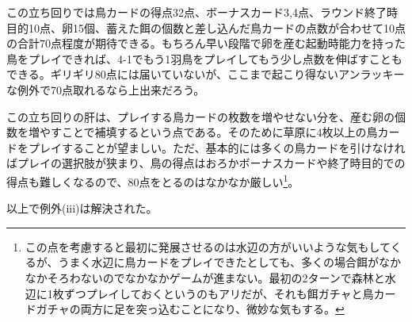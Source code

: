 \begin{multicols}{2}
\par
この立ち回りでは鳥カードの得点32点、ボーナスカード3,4点、ラウンド終了時目的10点、卵15個、蓄えた餌の個数と差し込んだ鳥カードの点数が合わせて10点の合計70点程度が期待できる。もちろん早い段階で卵を産む起動時能力を持った鳥をプレイできれば、4-1でもう1羽鳥をプレイしてもう少し点数を伸ばすこともできる。ギリギリ80点には届いていないが、ここまで起こり得ないアンラッキーな例外で70点取れるなら上出来だろう。
\par
この立ち回りの肝は、プレイする鳥カードの枚数を増やせない分を、産む卵の個数を増やすことで補填するという点である。そのために草原に4枚以上の鳥カードをプレイすることが望ましい。ただ、基本的には多くの鳥カードを引けなければプレイの選択肢が狭まり、鳥の得点はおろかボーナスカードや終了時目的での得点も難しくなるので、80点をとるのはなかなか厳しい\footnote{この点を考慮すると最初に発展させるのは水辺の方がいいような気もしてくるが、うまく水辺に鳥カードをプレイできたとしても、多くの場合餌がなかなかそろわないのでなかなかゲームが進まない。最初の2ターンで森林と水辺に1枚ずつプレイしておくというのもアリだが、それも餌ガチャと鳥カードガチャの両方に足を突っ込むことになり、微妙な気もする。}。
\par
以上で例外(i\hspace{-1.2pt}i\hspace{-1.2pt}i)は解決された。
\end{multicols}
